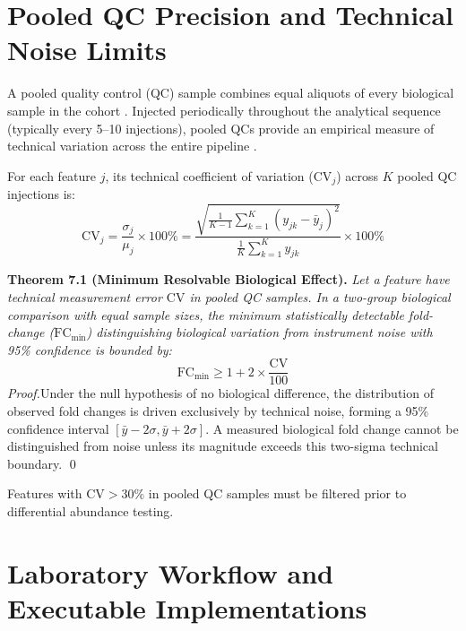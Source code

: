 \documentclass[11pt,twoside,openright]{book}
\begin{document}
\section{Pooled QC Precision and Technical Noise Limits}
\label{sec:pooled_qc_precision}

A pooled quality control (QC) sample combines equal aliquots of every biological sample in the cohort \cite{dunn2011procedures, gika2007quality}. Injected periodically throughout the analytical sequence (typically every 5--10 injections), pooled QCs provide an empirical measure of technical variation across the entire pipeline \cite{broadhurst2018guidelines, sangster2006investigation}.

For each feature $j$, its technical coefficient of variation ($\text{CV}_j$) across $K$ pooled QC injections is:
\begin{equation}
\text{CV}_j = \frac{\sigma_j}{\mu_j} \times 100\% = \frac{\sqrt{\frac{1}{K-1} \sum_{k=1}^K (y_{jk} - \bar{y}_j)^2}}{\frac{1}{K} \sum_{k=1}^K y_{jk}} \times 100\%
\end{equation}

\noindent\textbf{Theorem 7.1 (Minimum Resolvable Biological Effect).}\enspace
\textit{Let a feature have technical measurement error $\text{CV}$ in pooled QC samples. In a two-group biological comparison with equal sample sizes, the minimum statistically detectable fold-change ($\text{FC}_{\min}$) distinguishing biological variation from instrument noise with 95\% confidence is bounded by:
\begin{equation}
\text{FC}_{\min} \ge 1 + 2 \times \frac{\text{CV}}{100}
\end{equation}
Proof.}\enspace Under the null hypothesis of no biological difference, the distribution of observed fold changes is driven exclusively by technical noise, forming a 95\% confidence interval $[\bar{y} - 2\sigma, \bar{y} + 2\sigma]$. A measured biological fold change cannot be distinguished from noise unless its magnitude exceeds this two-sigma technical boundary. \qed

Features with $\text{CV} > 30\%$ in pooled QC samples must be filtered prior to differential abundance testing.

\section{Laboratory Workflow and Executable Implementations}
\label{sec:lab_implementation}
\end{document}
